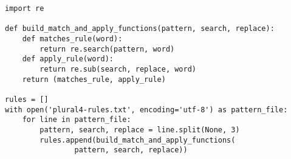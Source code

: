 \noindent\begin{minipage}{\textwidth}
\begin{lstlisting}[mathescape=False]
import re

def build_match_and_apply_functions(pattern, search, replace):
    def matches_rule(word):
        return re.search(pattern, word)
    def apply_rule(word):
        return re.sub(search, replace, word)
    return (matches_rule, apply_rule)

rules = []
with open('plural4-rules.txt', encoding='utf-8') as pattern_file:
    for line in pattern_file:
        pattern, search, replace = line.split(None, 3)
        rules.append(build_match_and_apply_functions(
                pattern, search, replace))
\end{lstlisting}
\end{minipage}

